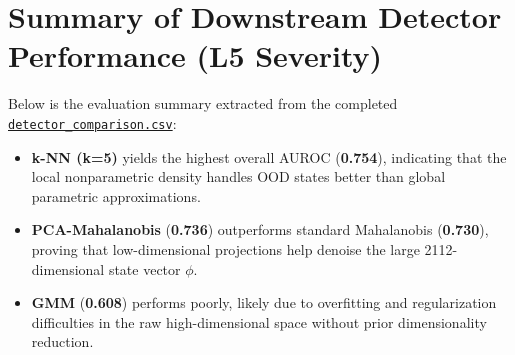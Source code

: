 \documentclass[11pt,a4paper]{article}
\begin{document}
\section{Summary of Downstream Detector Performance (L5 Severity)}
Below is the evaluation summary extracted from the completed \href{run:outputs/tables/detector_comparison.csv}{\texttt{detector\_comparison.csv}}:
\begin{itemize}
    \item \textbf{k-NN (k=5)} yields the highest overall AUROC (\textbf{0.754}), indicating that the local nonparametric density handles OOD states better than global parametric approximations.
    \item \textbf{PCA-Mahalanobis} (\textbf{0.736}) outperforms standard Mahalanobis (\textbf{0.730}), proving that low-dimensional projections help denoise the large 2112-dimensional state vector $\phi$.
    \item \textbf{GMM} (\textbf{0.608}) performs poorly, likely due to overfitting and regularization difficulties in the raw high-dimensional space without prior dimensionality reduction.
\end{itemize}
\end{document}
